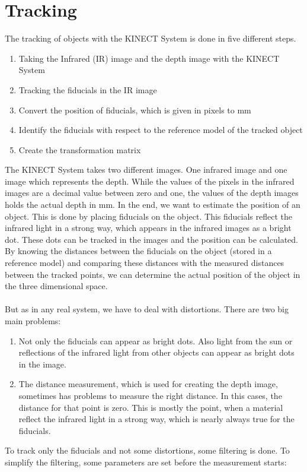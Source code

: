 \section{Tracking}
The tracking of objects with the KINECT System is done in five different steps. 
\begin{enumerate}
\item Taking the Infrared (IR) image and the depth image with the KINECT System
\item Tracking the fiducials in the IR image
\item Convert the position of fiducials, which is given in pixels to mm
\item Identify the fiducials with respect to the reference model of the tracked object
\item Create the transformation matrix
\end{enumerate}
The KINECT System takes two different images. One infrared image and one image which represents the depth. While the values of the pixels in the infrared images are a decimal value between zero and one, the values of the depth images holds the actual depth in mm. In the end, we want to estimate the position of an object. This is done by placing fiducials on the object. This fiducials reflect the infrared light in a strong way, which appears in the infrared images as a bright dot. These dots can be tracked in the images and the position can be calculated. By knowing the distances between the fiducials on the object (stored in a reference model) and comparing these distances with the measured distances between the tracked points, we can determine the actual position of the object in the three dimensional space.
\\ \\But as in any real system, we have to deal with distortions. There are two big main problems:
\begin{enumerate}
\item Not only the fiducials can appear as bright dots. Also light from the sun or reflections of the infrared light from other objects can appear as bright dots in the image.
\item The distance measurement, which is used for creating the depth image, sometimes has problems to measure the right distance. In this cases, the distance for that point is zero. This is mostly the point, when a material reflect the infrared light in a strong way, which is nearly always true for the fiducials.
\end{enumerate}
To track only the fiducials and not some distortions, some filtering is done. To simplify the filtering, some parameters are set before the measurement starts:
